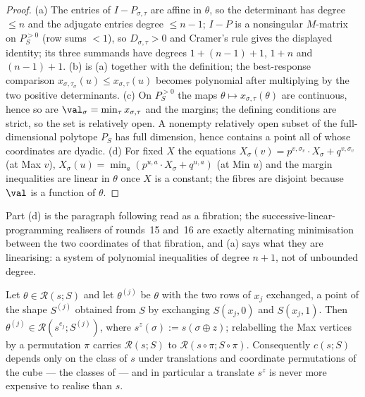 \begin{proof}
(a) The entries of $I-P_{\sigma,\tau}$ are affine in $\theta$, so the
determinant has degree $\le n$ and the adjugate entries degree $\le n-1$;
$I-P$ is a nonsingular $M$-matrix on $P^{>0}_S$ (row sums $<1$), so
$D_{\sigma,\tau}>0$ and Cramer's rule gives the displayed identity; its three
summands have degrees $1+(n-1)+1$, $1+n$ and $(n-1)+1$.
(b) is (a) together with the definition; the best-response comparison
$x_{\sigma,\tau_\sigma}(u)\le x_{\sigma,\tau}(u)$ becomes polynomial after
multiplying by the two positive determinants.
(c) On $P^{>0}_S$ the maps $\theta\mapsto x_{\sigma,\tau}(\theta)$ are
continuous, hence so are $\val_\sigma=\min_\tau x_{\sigma,\tau}$ and the
margins; the defining conditions are strict, so the set is relatively open. A
nonempty relatively open subset of the full-dimensional polytope $P_S$ has
full dimension, hence contains a point all of whose coordinates are dyadic.
(d) For fixed $X$ the equations $X_\sigma(v)=p^{v,\sigma_v}\!\cdot\!X_\sigma
+q^{v,\sigma_v}$ (at Max $v$), $X_\sigma(u)=\min_a(p^{u,a}\!\cdot\!X_\sigma+q^{u,a})$
(at Min $u$) and the margin inequalities are linear in $\theta$ once $X$ is a
constant; the fibres are disjoint because $\val$ is a function of $\theta$.
\end{proof}

\begin{remark}\label{rs:rem-fibre}
Part (d) is the paragraph following  read as a
fibration; the successive-linear-programming realisers of rounds~15 and~16 are
exactly alternating minimisation between the two coordinates of that
fibration, and (a) says what they are linearising: a system
of polynomial inequalities of degree $n+1$, not of unbounded degree.
\end{remark}

\begin{lemma}\label{rs:swap}
Let $\theta\in\mathcal R(s;S)$ and let $\theta^{(j)}$ be $\theta$ with the two
rows of $x_j$ exchanged, a point of the shape $S^{(j)}$ obtained from $S$ by
exchanging $S(x_j,0)$ and $S(x_j,1)$. Then
$\theta^{(j)}\in\mathcal R(s^{e_j};S^{(j)})$, where $s^{z}(\sigma):=s(\sigma\oplus z)$;
relabelling the Max vertices by a permutation $\pi$ carries
$\mathcal R(s;S)$ to $\mathcal R(s\circ\pi;S\circ\pi)$. Consequently
$c(s;S)$ depends only on the class of $s$ under translations and coordinate
permutations of the cube --- the classes of  --- and
in particular a translate $s^{z}$ is never more expensive to realise than $s$.
\end{lemma}

